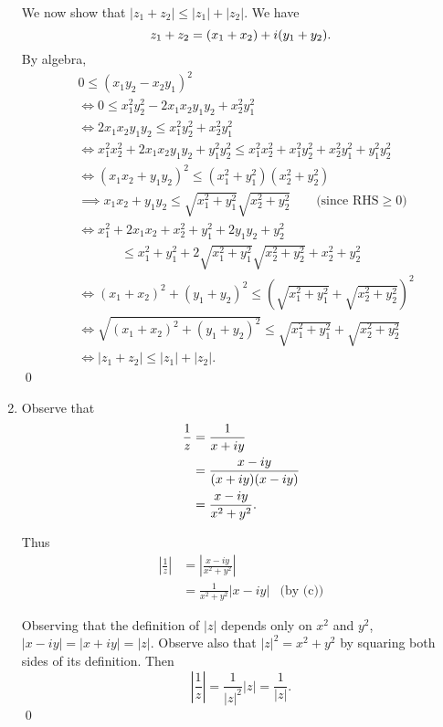 \documentclass[oneside]{article}
\newcommand\abs[1]{\left|#1\right|}
\begin{document}
\begin{enumerate}[label=\textbf{(\alph*)}]
      We now show that $\abs{z_1 + z_2} \leq \abs{z_1} + \abs{z_2}$. We have
      \[
        z_1 + z_2 = (x_1 + x_2) + i(y_1 + y_2) \text.
      \]
      By algebra,
      \begin{align*}
        & 0 \leq (x_1y_2-x_2y_1)^2 \\
        & \iff 0 \leq x_1^2y_2^2 - 2x_1x_2y_1y_2 + x_2^2y_1^2 \\
        & \iff 2x_1x_2y_1y_2 \leq x_1^2y_2^2 + x_2^2y_1^2 \\
        & \iff x_1^2x_2^2 + 2x_1x_2y_1y_2 + y_1^2y_2^2
          \leq x_1^2x_2^2 + x_1^2y_2^2 + x_2^2y_1^2 + y_1^2y_2^2 \\
        & \iff (x_1x_2 + y_1y_2)^2
          \leq \left(x_1^2 + y_1^2\right)\left(x_2^2 + y_2^2\right) \\
        & \implies x_1x_2 + y_1y_2
          \leq \sqrt{x_1^2 + y_1^2}\sqrt{x_2^2 + y_2^2} \hspace{20pt} \text{ (since $\mathrm{RHS} \geq 0$)} \\
        & \iff x_1^2 + 2x_1x_2 + x_2^2 + y_1^2 + 2y_1y_2 + y_2^2
          \\&\hspace{40pt} \leq x_1^2 + y_1^2
            + 2\sqrt{x_1^2 + y_1^2}\sqrt{x_2^2 + y_2^2}
            + x_2^2 + y_2^2 \\
        & \iff (x_1 + x_2)^2 + (y_1 + y_2)^2
          \leq \left(\sqrt{x_1^2 + y_1^2} + \sqrt{x_2^2 + y_2^2}\right)^2 \\
        & \iff \sqrt{(x_1 + x_2)^2 + (y_1 + y_2)^2}
          \leq \sqrt{x_1^2 + y_1^2} + \sqrt{x_2^2 + y_2^2} \\
        & \iff \abs{z_1 + z_2} \leq \abs{z_1} + \abs{z_2} \text{.}
      \end{align*}\qed

    \item Observe that \begin{align*}
        \frac{1}{z} &= \frac{1}{x + iy} \\
        &= \frac{x - iy}{(x + iy)(x - iy)} \\
        &= \frac{x - iy}{x^2 + y^2}\text.
      \end{align*}

      Thus \begin{align*}
        \abs{\frac{1}{z}} &= \abs{\frac{x - iy}{x^2 + y^2}} \\
        &= \frac{1}{x^2 + y^2}\abs{x - iy} & \text{(by (c))}
      \end{align*}

      Observing that the definition of $\abs{z}$ depends only on $x^2$ and
      $y^2$, $\abs{x-iy} = \abs{x + iy} = \abs{z}$. Observe also that
      $\abs{z}^2 = x^2 + y^2$ by squaring both sides of its definition. Then \[
        \abs{\frac{1}{z}} = \frac{1}{\abs{z}^2}\abs{z} = \frac{1}{\abs{z}}.
      \]
      \qed

  \end{enumerate}
\end{document}
